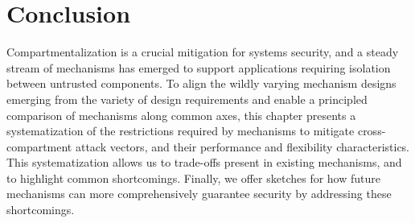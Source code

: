 \section{Conclusion}
\label{sec:compsok:conclusion}
Compartmentalization is a crucial mitigation for systems security, and a steady
stream of mechanisms has emerged to support applications requiring isolation
between untrusted components.
To align the wildly varying mechanism designs emerging from the variety of
design requirements and enable a principled comparison of mechanisms along 
common axes, this chapter presents a systematization of the restrictions required
by mechanisms to mitigate cross-compartment attack vectors, and their performance
and flexibility characteristics.
This systematization allows us to trade-offs present in existing mechanisms,
and to highlight common shortcomings.
Finally, we offer sketches for how future mechanisms can more comprehensively
guarantee security by addressing these shortcomings.
